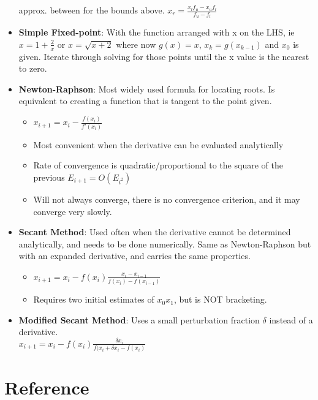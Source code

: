 \documentclass[fontsize=5pt]{scrartcl}
\begin{document}
\begin{multicols}{3}
\begin{itemize}
          approx. between for the bounds above.
          $x_r = \frac{x_lf_u-x_uf_l}{f_u-f_l}$
        \item \textbf{Simple Fixed-point}: With the function arranged with x on the LHS, ie $x = 1+\frac{2}{x}$ or
          $x = \sqrt{x+2}$ where now $g(x) = x$, $x_k = g(x_{k-1})$ and $x_0$ is given. Iterate through solving
          for those points until the x value is the nearest to zero.
        \item \textbf{Newton-Raphson}: Most widely used formula for locating roots. Is equivalent to creating a 
        function that is tangent to the point given.
          \begin{itemize}
            \item $x_{i+1} = x_i - \frac{f(x_i)}{f'(x_i)}$
            \item Most convenient when the derivative can be evaluated analytically
            \item Rate of convergence is quadratic/proportional to the square of the previous $E_{i+1} = O(E_{i^2})$
            \item Will not always converge, there is no convergence criterion, and it may converge very slowly.
          \end{itemize}
        \item \textbf{Secant Method}: Used often when the derivative cannot be determined analytically, and needs
          to be done numerically. Same as Newton-Raphson but with an expanded derivative, and carries the same
          properties.
          \begin{itemize}
            \item $x_{i+1} = x_i - f(x_i)\frac{x_i-x_{i-1}}{f(x_i)-f(x_{i-1})}$
            \item Requires two initial estimates of $x_0 x_1$, but is NOT bracketing.
          \end{itemize}
        \item \textbf{Modified Secant Method}: Uses a small perturbation fraction $\delta$ instead of a derivative. \\
          $x_{i+1} = x_i - f(x_i)\frac{\delta x_i}{f(x_i+\delta x_i-f(x_i)}$
      \end{itemize}
      
  \section{Reference}

\end{multicols}
\end{document}
